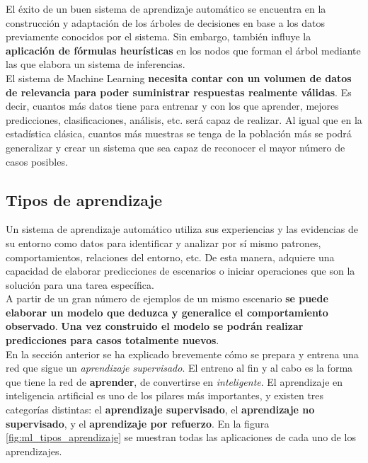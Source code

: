 El éxito de un buen sistema de aprendizaje automático se encuentra en la construcción y adaptación de los árboles de decisiones en base a los datos previamente conocidos por el sistema. Sin embargo, también influye la \textbf{aplicación de fórmulas heurísticas} en los nodos que forman el árbol mediante las que elabora un sistema de inferencias. \\

El sistema de Machine Learning \textbf{necesita contar con un volumen de datos de relevancia para poder suministrar respuestas realmente válidas}. Es decir, cuantos más datos tiene para entrenar y con los que aprender, mejores predicciones, clasificaciones, análisis, etc. será capaz de realizar. Al igual que en la estadística clásica, cuantos más muestras se tenga de la población más se podrá generalizar y crear un sistema que sea capaz de reconocer el mayor número de casos posibles. 

\subsection{Tipos de aprendizaje}

Un sistema de aprendizaje automático utiliza sus experiencias y las evidencias de su entorno como datos para identificar y analizar por sí mismo patrones, comportamientos, relaciones del entorno, etc. De esta manera, adquiere una capacidad de elaborar predicciones de escenarios o iniciar operaciones que son la solución para una tarea específica. \\

A partir de un gran número de ejemplos de un mismo escenario \textbf{se puede elaborar un modelo que deduzca y generalice el comportamiento observado}. \textbf{Una vez construido el modelo se podrán realizar predicciones para casos totalmente nuevos}. \\

En la sección anterior se ha explicado brevemente cómo se prepara y entrena una red que sigue un \textit{aprendizaje supervisado}. El entreno al fin y al cabo es la forma que tiene la red de \textbf{aprender}, de convertirse en \textit{inteligente}. El aprendizaje en inteligencia artificial es uno de los pilares más importantes, y existen tres categorías distintas: el \textbf{aprendizaje supervisado}, el \textbf{aprendizaje no supervisado}, y el \textbf{aprendizaje por refuerzo}. En la figura \ref{fig:ml_tipos_aprendizaje} se muestran todas las aplicaciones de cada uno de los aprendizajes. 
 
